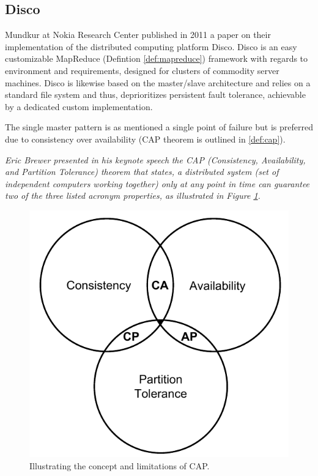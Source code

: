 \subsection*{Disco}
Mundkur \etal at Nokia Research Center published in 2011 a paper on their implementation of the distributed computing platform Disco\cite{PageDisco}\cite{Mundkur:2011:DCP:2034654.2034670}. Disco is an easy customizable MapReduce (Defintion \ref{def:mapreduce}) framework with regards to environment and requirements, designed for clusters of commodity server machines. Disco is likewise based on the master/slave architecture and relies on a standard file system and thus, deprioritizes persistent fault tolerance, achievable by a dedicated custom implementation. 
\newline

The single master pattern is as mentioned a single point of failure but is preferred due to consistency over availability (CAP theorem is outlined in \ref{def:cap}).
\vspace*{2mm}

\begin{definition} \label{def:cap}
\textit{Eric Brewer presented in his keynote speech}\cite{Brewer2000} \textit{the CAP (Consistency, Availability, and Partition Tolerance) theorem that states, a distributed system (set of independent computers working together) only at any point in time can guarantee two of the three listed acronym properties, as illustrated in Figure \ref{fig:cap}.}

\begin{figure}[h!]
	\centering
	\includegraphics[scale=0.7]{pdf/cap.pdf}
	\caption{Illustrating the concept and limitations of CAP. \label{fig:cap}}
\end{figure}	
\end{definition}

